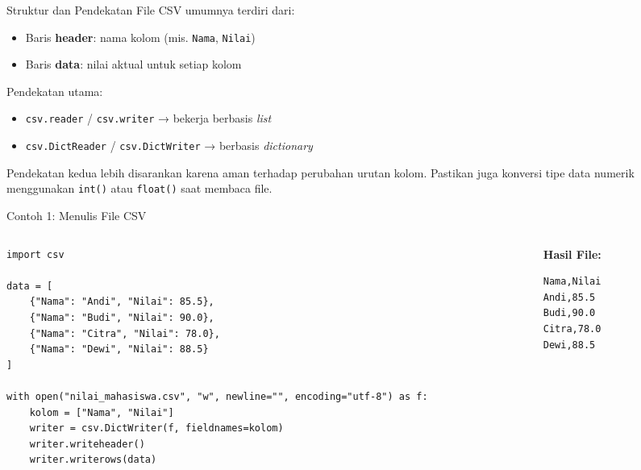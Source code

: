 \documentclass[aspectratio=169, table]{beamer}
\begin{document}
\begin{frame}{Struktur dan Pendekatan}
\vspace{20pt}
File CSV umumnya terdiri dari:
\begin{itemize}
  \item Baris \textbf{header}: nama kolom (mis. \texttt{Nama}, \texttt{Nilai})
  \item Baris \textbf{data}: nilai aktual untuk setiap kolom
\end{itemize}
Pendekatan utama:
\begin{itemize}
  \item \texttt{csv.reader} / \texttt{csv.writer} → bekerja berbasis \textit{list}
  \item \texttt{csv.DictReader} / \texttt{csv.DictWriter} → berbasis \textit{dictionary}
\end{itemize}
Pendekatan kedua lebih disarankan karena aman terhadap perubahan urutan kolom.  
Pastikan juga konversi tipe data numerik menggunakan \texttt{int()} atau \texttt{float()} saat membaca file.
\end{frame}

\begin{frame}[fragile]{Contoh 1: Menulis File CSV}
\vspace{20pt}
\begin{columns}[T, totalwidth=\textwidth]
  \begin{column}{0.65\textwidth}
  \begin{lstlisting}[style=PythonStyle]
import csv

data = [
    {"Nama": "Andi", "Nilai": 85.5},
    {"Nama": "Budi", "Nilai": 90.0},
    {"Nama": "Citra", "Nilai": 78.0},
    {"Nama": "Dewi", "Nilai": 88.5}
]

with open("nilai_mahasiswa.csv", "w", newline="", encoding="utf-8") as f:
    kolom = ["Nama", "Nilai"]
    writer = csv.DictWriter(f, fieldnames=kolom)
    writer.writeheader()
    writer.writerows(data)
  \end{lstlisting}
  \end{column}

  \begin{column}{0.3\textwidth}
  \textbf{Hasil File:}
  \begin{lstlisting}[language=bash, caption={Isi file nilai_mahasiswa.csv}]
Nama,Nilai
Andi,85.5
Budi,90.0
Citra,78.0
Dewi,88.5
  \end{lstlisting}
  \end{column}
\end{columns}
\end{frame}
\end{document}
